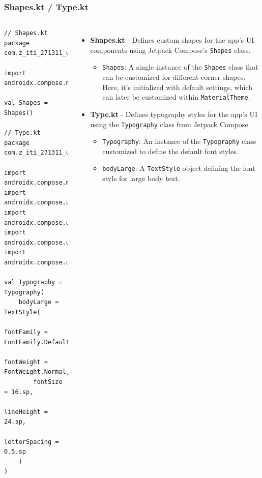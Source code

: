 \documentclass[pdf,
serif,
compress,
xcolor=table,
dvipsnames,
spanish,
aspectratio=169]{beamer}
\begin{document}
\begin{frame}[fragile]
    \frametitle{Shapes.kt / Type.kt}
\begin{columns}
\begin{verbatim}
// Shapes.kt
package com.z_iti_271311_u1_ae_lopez_leal_antonio_isai.ui.theme

import androidx.compose.material3.Shapes

val Shapes = Shapes()

// Type.kt
package com.z_iti_271311_u1_ae_lopez_leal_antonio_isai.ui.theme

import androidx.compose.material3.Typography
import androidx.compose.ui.text.TextStyle
import androidx.compose.ui.text.font.FontFamily
import androidx.compose.ui.text.font.FontWeight
import androidx.compose.ui.unit.sp

val Typography = Typography(
    bodyLarge = TextStyle(
        fontFamily = FontFamily.Default,
        fontWeight = FontWeight.Normal,
        fontSize = 16.sp,
        lineHeight = 24.sp,
        letterSpacing = 0.5.sp
    )
)
\end{verbatim}

\begin{itemize}\tiny
    \item \textbf{Shapes.kt} - Defines custom shapes for the app's UI components using Jetpack Compose's \texttt{Shapes} class.
    \begin{itemize}\tiny
        \item \texttt{Shapes}: A single instance of the \texttt{Shapes} class that can be customized for different corner shapes. Here, it’s initialized with default settings, which can later be customized within \texttt{MaterialTheme}.
    \end{itemize}

    \item \textbf{Type.kt} - Defines typography styles for the app's UI using the \texttt{Typography} class from Jetpack Compose.
    \begin{itemize}\tiny
        \item \texttt{Typography}: An instance of the \texttt{Typography} class customized to define the default font styles.
        \item \texttt{bodyLarge}: A \texttt{TextStyle} object defining the font style for large body text.
    \end{itemize}
\end{itemize}
\end{columns}
\end{frame}
\end{document}
